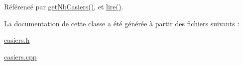 Référencé par \hyperlink{class_casiers_affa8551c477b3cdfe15cd19964d8a391}{get\+Nb\+Casiers()}, et \hyperlink{class_casiers_a7b1d58f40217ef13a5dd0d966df38c9a}{lire()}.



La documentation de cette classe a été générée à partir des fichiers suivants \+:\begin{DoxyCompactItemize}
\item 
\hyperlink{casiers_8h}{casiers.\+h}\item 
\hyperlink{casiers_8cpp}{casiers.\+cpp}\end{DoxyCompactItemize}
